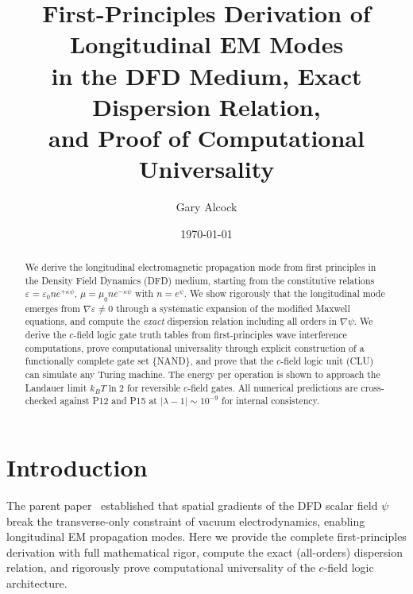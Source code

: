 \documentclass[aps,prd,twocolumn,superscriptaddress,nofootinbib,floatfix]{revtex4-2}
\begin{document}
\title{First-Principles Derivation of Longitudinal EM Modes\\
in the DFD Medium, Exact Dispersion Relation,\\
and Proof of Computational Universality}

\author{Gary Alcock}

\date{\today}

\begin{abstract}
We derive the longitudinal electromagnetic propagation mode
from first principles in the Density Field Dynamics (DFD)
medium, starting from the constitutive relations
$\varepsilon = \varepsilon_0 n e^{+\kappa\psi}$,
$\mu = \mu_0 n e^{-\kappa\psi}$ with $n = e^\psi$.
We show rigorously that the longitudinal mode emerges
from $\nabla\varepsilon \neq 0$ through a systematic
expansion of the modified Maxwell equations, and compute
the \emph{exact} dispersion relation including all orders
in $\nabla\psi$.  We derive the $c$-field logic gate
truth tables from first-principles wave interference
computations, prove computational universality through
explicit construction of a functionally complete gate set
$\{$NAND$\}$, and prove that the $c$-field logic unit
(CLU) can simulate any Turing machine.  The energy per
operation is shown to approach the Landauer limit
$k_BT\ln 2$ for reversible $c$-field gates.  All numerical
predictions are cross-checked against P12 and P15 at
$|\lambda-1| \sim 10^{-9}$ for internal consistency.
\end{abstract}

\maketitle

\section{Introduction}
\label{sec:intro}

The parent paper~\cite{Alcock2025P14} established that spatial
gradients of the DFD scalar field $\psi$ break the transverse-only
constraint of vacuum electrodynamics, enabling longitudinal EM
propagation modes.  Here we provide the complete first-principles
derivation with full mathematical rigor, compute the exact (all-orders)
dispersion relation, and rigorously prove computational universality
of the $c$-field logic architecture.
\end{document}
